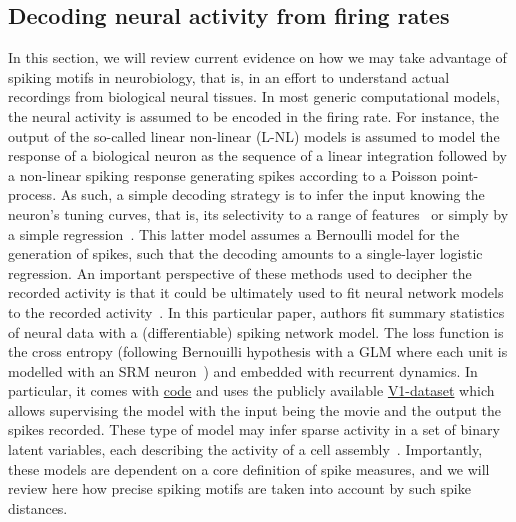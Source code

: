 \documentclass[brainsci, %
               review,submit,pdftex,moreauthors
               ]{Definitions/mdpi}
\begin{document}
\subsection{Decoding neural activity from firing rates}
In this section, we will review current evidence on how we may take advantage of spiking motifs in neurobiology, that is, in an effort to understand actual recordings from biological neural tissues. In most generic computational models, the neural activity is assumed to be encoded in the firing rate. For instance, the output of the so-called linear non-linear (L-NL) models is assumed to model the response of a biological neuron as the sequence of a linear integration followed by a non-linear spiking response generating spikes according to a Poisson point-process. As such, a simple decoding strategy is to infer the input knowing the neuron's tuning curves, that is, its selectivity to a range of features~\citep{jazayeri_optimal_2006} or simply by a simple regression~\citep{berens_fast_2012}. This latter model assumes a Bernoulli model for the generation of spikes, such that the decoding amounts to a single-layer logistic regression. An important perspective of these methods used to decipher the recorded activity is that it could be ultimately used to fit neural network models to the recorded activity~\citep{bellec_fitting_2021}. In this particular paper, authors fit summary statistics of neural data with a (differentiable) spiking network model. The loss function is the cross entropy (following Bernouilli hypothesis with a GLM where each unit is modelled with an SRM neuron~\citep{gerstner_time_1995}) and embedded with recurrent dynamics. In particular, it comes with \href{https://github.com/EPFL-LCN/pub-bellec-wang-2021-sample-and-measure}{code} and uses the publicly available \href{http://crcns.org/data-sets/vc/pvc-11}{V1-dataset} which allows supervising the model with the input being the movie and the output the spikes recorded. These type of model may infer sparse activity in a set of binary latent variables, each describing the activity of a cell assembly~\citep{warner_probabilistic_2022}.
 Importantly, these models are dependent on a core definition of spike measures, and we will review here how precise spiking motifs are taken into account by such spike distances.
%
\end{document}

